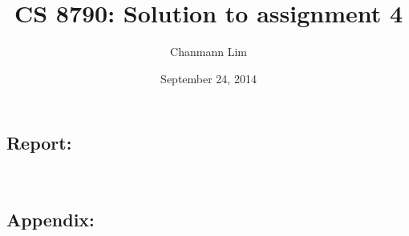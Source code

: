 \documentclass[a4paper]{article}
\begin{document}
\title{CS 8790: Solution to assignment 4}
\author{Chanmann Lim}
\date{September 24, 2014}
\maketitle

\subsection*{Report:} ~\\
\indent 

\newpage
\subsection*{Appendix:}

\end{document}
